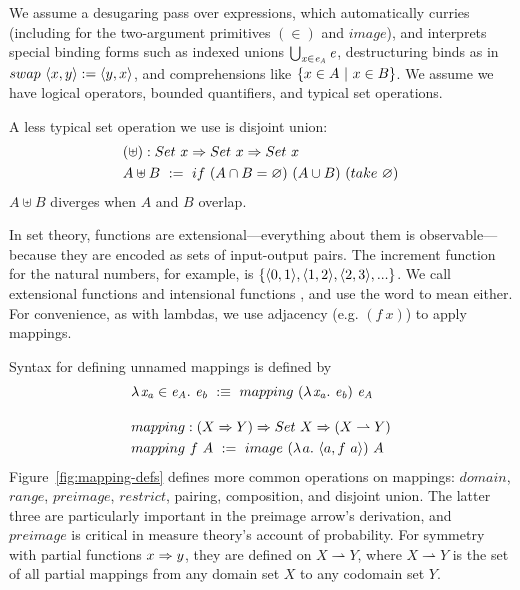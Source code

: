 \documentclass[preprint]{sigplanconf}
\newcommand{\pto}{\rightharpoonup}
\begin{document}
We assume a desugaring pass over \lzfclang expressions, which automatically curries (including for the two-argument primitives $(\in)$ and $image$), and interprets special binding forms such as indexed unions $\textstyle\bigcup_{\mathit{x} \in \mathit{e_A}}\mathit{e}$, destructuring binds as in $swap~\langle{x,y}\rangle := \langle{y,x}\rangle$, and comprehensions like $\lbrace {x \in A} \ \lvert\ {x \in B} \rbrace$.
We assume we have logical operators, bounded quantifiers, and typical set operations.

A less typical set operation we use is disjoint union:
\begin{equation}
\begin{aligned}
	&(\uplus) : Set~x \Rightarrow Set~x \Rightarrow Set~x \\
	&A \uplus B \ := \ if~(A \cap B = \varnothing)~(A \cup B)~(take~\varnothing)
\end{aligned}
\end{equation}
$A \uplus B$ diverges when $A$ and $B$ overlap.

In set theory, functions are extensional---everything about them is observable---because they are encoded as sets of input-output pairs.
The increment function for the natural numbers, for example, is $\{{\langle{0,1}\rangle,\langle{1,2}\rangle,\langle{2,3}\rangle,...}\}$.
We call extensional functions  and intensional functions , and use the word  to mean either.
For convenience, as with lambdas, we use adjacency (e.g. $(f~x)$) to apply mappings.

Syntax for defining unnamed mappings is defined by
\begin{align}
	&\fun{\mathit{x_a} \in \mathit{e_A}}{\mathit{e_b}} \ :\equiv\ mapping~(\fun{\mathit{x_a}}\mathit{e_b})~\mathit{e_A} \\
\nonumber\\[-6pt]
	&\begin{aligned}
		&mapping : (X \tto Y) \tto Set~X \tto (X \pto Y) \\
		&mapping~f~A \ := \ image~(\fun{a}{\pair{a,f~a}})~A
	\end{aligned}
\end{align}
Figure~\ref{fig:mapping-defs} defines more common operations on mappings: $domain$, $range$, $preimage$, $restrict$, pairing, composition, and disjoint union.
The latter three are particularly important in the preimage arrow's derivation, and $preimage$ is critical in measure theory's account of probability.
For symmetry with partial functions $x \Rightarrow y$, they are defined on $X \pto Y$, where $X \pto Y$ is the set of all partial mappings from any domain set $X$ to any codomain set $Y$.
\end{document}
